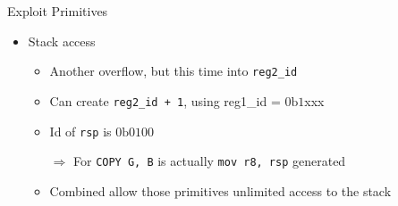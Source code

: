 \documentclass[usenames,dvipsnames]{beamer}
\begin{document}
\begin{frame}{Exploit Primitives}
\begin{itemize}
            \item Stack access
             {
                \begin{itemize}
                \item Another overflow, but this time into \lstinline{reg2_id}
                \item Can create \lstinline{reg2_id + 1}, using reg1\_id = $0\text{b}1$xxx
                \item Id of \lstinline{rsp} is $0\text{b}0100$
                \item[$\Rightarrow$] For \lstinline{COPY G, B} is actually \lstinline{mov r8, rsp} generated
                \item Combined allow those primitives unlimited access to the stack
                \end{itemize}
            }
        \end{itemize}
    \end{frame}
\end{document}

